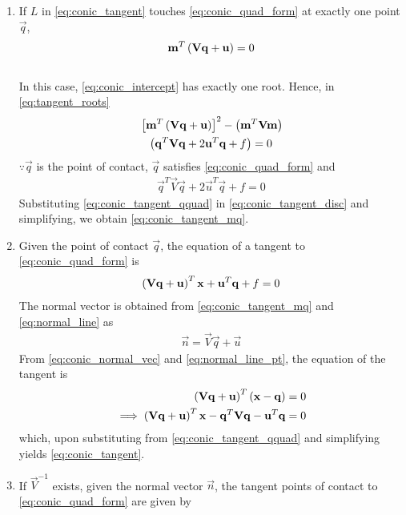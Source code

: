 \documentclass[journal,12pt,twocolumn]{IEEEtran}
\renewcommand\thesection{\arabic{section}}
\renewcommand\thesubsection{\thesection.\arabic{subsection}}
\begin{document}
\begin{enumerate}[label=\thesubsection.\arabic*.,ref=\thesubsection.\theenumi]
\item  If $L$ in \eqref{eq:conic_tangent} touches \eqref{eq:conic_quad_form} at exactly one point $\vec{q}$, 
  \begin{align}
  \mathbf{m}^T\left(\mathbf{V}\mathbf{q}+\mathbf{u}\right) = 0
  \label{eq:conic_tangent_mq}
  \end{align}
\\
\solution
In this case, \eqref{eq:conic_intercept} has exactly one root.  Hence, 
  in \eqref{eq:tangent_roots}
  \begin{multline}
  {}\left[
  \mathbf{m}^T\left(\mathbf{V}\mathbf{q}+\mathbf{u}\right)
  \right]^2 -\left(\mathbf{m}^T\mathbf{V}\mathbf{m}\right)
  \\
  \left(
  \mathbf{q}^T\mathbf{V}\mathbf{q} + 2\mathbf{u}^T\mathbf{q} +f
  \right) = 0                                                                                             
  \label{eq:conic_tangent_disc}
  \end{multline}                    
  $\because \vec{q}$ is the point of contact, $\vec{q}$ satisfies \eqref{eq:conic_quad_form}
  and 
  \begin{align}
  \vec{q}^T\vec{V}\vec{q} + 2\vec{u}^T\vec{q} +f = 0
  \label{eq:conic_tangent_qquad}
  \end{align}
  Substituting \eqref{eq:conic_tangent_qquad} in \eqref{eq:conic_tangent_disc} and simplifying, we obtain \eqref{eq:conic_tangent_mq}.
  \item Given the point of contact $\vec{q}$, the equation of a tangent to \eqref{eq:conic_quad_form} is 
  \begin{align}
  \left(\mathbf{V}\mathbf{q}+\mathbf{u}\right)^T\mathbf{x}+\mathbf{u}^T\mathbf{q}+f = 0
  \label{eq:conic_tangent_final}
  \end{align}
  \solution The normal vector is obtained from \eqref{eq:conic_tangent_mq} 
and \eqref{eq:normal_line}
  as
  \begin{align}
  \label{eq:conic_normal_vec}
  \vec{n} = \vec{V}\vec{q}+\vec{u}
  \end{align}  
  From \eqref{eq:conic_normal_vec} and \eqref{eq:normal_line_pt}, the equation of the tangent is\begin{align}
    \left(\mathbf{V}\mathbf{q}+\mathbf{u}\right)^T\left(\mathbf{x}-\mathbf{q}\right) &=0
    \\
    \implies \left(\mathbf{V}\mathbf{q}+\mathbf{u}\right)^T\mathbf{x}-\mathbf{q}^T\mathbf{V}\mathbf{q}-\mathbf{u}^T\mathbf{q} &= 0
    \end{align}
    which, upon substituting from \eqref{eq:conic_tangent_qquad} and simplifying yields \eqref{eq:conic_tangent}.
    \item   If $\vec{V}^{-1}$ exists, given the normal vector $\vec{n}$, the tangent points of contact to \eqref{eq:conic_quad_form} are given by

\end{enumerate}
\end{document}

